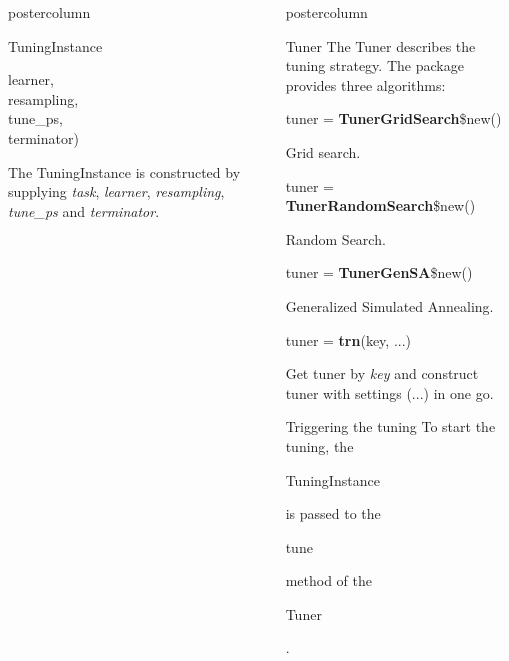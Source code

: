 \documentclass{beamer}
\newlength{\columnheight} %
\newcommand{\codeinline}[1]{\begin{codeboxinline}#1\end{codeboxinline}}
\begin{document}
\begin{frame}[fragile]{}
\begin{columns}
\begin{column}{.245\textwidth}
\begin{beamercolorbox}[center]{postercolumn}
\begin{minipage}{.98\textwidth}
{\begin{myblock}{TuningInstance}
\begin{codeboxmultiline}[width=18cm]
						\hspace*{1ex}learner,\\
						\hspace*{1ex}resampling,\\
						\hspace*{1ex}tune\_ps,\\
						\hspace*{1ex}terminator)
					\end{codeboxmultiline}
					The TuningInstance is constructed by supplying \textit{task}, \textit{learner}, \textit{resampling}, \textit{tune\_ps} and \textit{terminator}. 
					\\
				\end{myblock}	
					\vfill}
				\end{minipage}
			\end{beamercolorbox}
		\end{column}
		\begin{column}{.245\textwidth}
			\begin{beamercolorbox}[center]{postercolumn}
				\begin{minipage}{.98\textwidth}
					\parbox[t][\columnheight]{\textwidth}{
						\begin{myblock}{Tuner}
							The Tuner describes the tuning strategy. The package provides three algorithms:
							\\
							\begin{codebox}
								tuner = \textbf{TunerGridSearch}\$new()
							\end{codebox}
							Grid search.
							\\
							\begin{codebox}
								tuner = \textbf{TunerRandomSearch}\$new()
							\end{codebox}
							Random Search.
							\\
							\begin{codebox}
								tuner = \textbf{TunerGenSA}\$new()
							\end{codebox}
							Generalized Simulated Annealing.
							\\
							\begin{codebox}
								tuner = \textbf{trn}(key, ...)
							\end{codebox}
							Get tuner by \textit{key} and construct tuner with settings (...) in one go.
						\end{myblock}
						\begin{myblock}{Triggering the tuning}
							To start the tuning, the \codeinline{TuningInstance} is passed to the \codeinline{tune} method of the \codeinline{Tuner}.

\end{myblock}}
\end{minipage}
\end{beamercolorbox}
\end{column}
\end{columns}
\end{frame}
\end{document}
